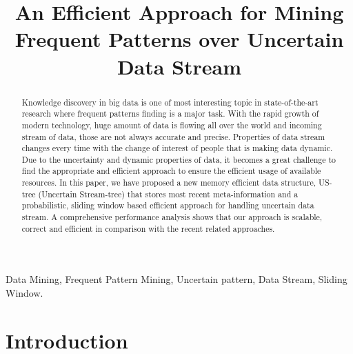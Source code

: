 \documentclass[conference]{IEEEtran}
\begin{document}
\title{An Efficient Approach for Mining Frequent Patterns over Uncertain Data Stream}

\author{
}

\maketitle

\begin{abstract}
Knowledge discovery in big data is one of most interesting topic in state-of-the-art research where frequent patterns finding is a major task. With the rapid growth of modern technology, huge amount of data is flowing all over the world and incoming stream of data, those are not always accurate and precise. Properties of data stream changes every time with the change of interest of people that is making data dynamic. Due to the uncertainty and dynamic properties of data, it becomes a great challenge to find the appropriate and efficient approach to ensure the efficient usage of available resources. In this paper, we have proposed a new memory efficient data structure, US-tree (Uncertain Stream-tree) that stores most recent meta-information and a probabilistic, sliding window based efficient approach for handling uncertain data stream. A comprehensive performance analysis shows that our approach is scalable, correct and efficient in comparison with the recent related approaches.
\end{abstract}

\begin{IEEEkeywords}
Data Mining, Frequent Pattern Mining, Uncertain pattern, Data Stream, Sliding Window.
\end{IEEEkeywords}

\IEEEpeerreviewmaketitle

\section{Introduction}
\end{document}
